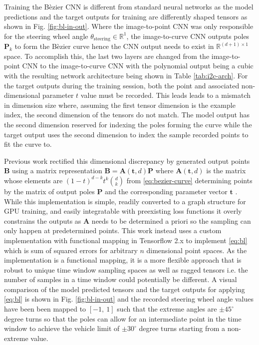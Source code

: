 \documentclass[conference]{IEEEtran}
\begin{document}
Training the B\`ezier CNN is different from standard neural networks as the model predictions and the target outputs for training are differently shaped tensors as shown in Fig. \ref{fig:bl-in-out}. Where the image-to-point CNN was only responsible for the steering wheel angle $\theta_{\text{steering}} \in \mathbb{R}^1$, the image-to-curve CNN outputs poles $\mathbf{P}_k$ to form the B\`ezier curve hence the CNN output needs to exist in $\mathbb{R}^{(d+1)\times 1}$ space. To accomplish this, the last two layers are changed from the image-to-point CNN to the image-to-curve CNN with the polynomial output being a cubic with the resulting network architecture being shown in Table \ref{tab:i2c-arch}. For the target outputs during the training session, both the point and associated non-dimensional parameter $t$ value must be recorded. This leads leads to a mismatch in dimension size where, assuming the first tensor dimension is the example index, the second dimension of the tensors do not match. The model output has the second dimension reserved for indexing the poles forming the curve while the target output uses the second dimension to index the sample recorded points to fit the curve to.

Previous work rectified this dimensional discrepancy by generated output points $\mathbf{B}$ using a matrix representation $\mathbf{B} = \mathbf{A}(\mathbf{t},d) \mathbf{P}$ where $\mathbf{A}(\mathbf{t},d)$ is the matrix whose elements are $(1-t)^{d-k}t^k \genfrac(){0pt}{0}{d}{k}$ from \eqref{eq:bezier-curve} determining points by the matrix of output poles $\mathbf{P}$ and the corresponding parameter vector $\mathbf{t}$ \cite{trent2020iros}. While this implementation is simple, readily converted to a graph structure for GPU training, and easily integratable with preexisting loss functions it overly constrains the outputs as $\mathbf{A}$ needs to be determined a priori so the sampling can only happen at predetermined points. This work instead uses a custom implementation with functional mapping in Tensorflow 2.x to implement \eqref{eq:bl} which is sum of squared errors for arbitrary $n$ dimensional point spaces. As the implementation is a functional mapping, it is a more flexible approach that is robust to unique time window sampling spaces as well as ragged tensors i.e. the number of samples in a time window could potentially be different. A visual comparison of the model predicted tensors and the target outputs for applying \eqref{eq:bl} is shown in Fig. \ref{fig:bl-in-out} and the recorded steering wheel angle values have been been mapped to $[-1,\ 1]$ such that the extreme angles are $\pm 45^\circ$ degree turns so that the poles can allow for an intermediate point in the time window to achieve the vehicle limit of $\pm 30^\circ$ degree turns starting from a non-extreme value.
\end{document}
